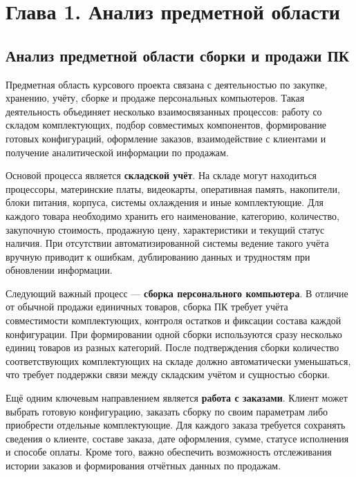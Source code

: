 \section*{Глава 1. Анализ предметной области}

\subsection{Анализ предметной области сборки и продажи ПК}

Предметная область курсового проекта связана с деятельностью по закупке, хранению, учёту, сборке и продаже персональных компьютеров. Такая деятельность объединяет несколько взаимосвязанных процессов: работу со складом комплектующих, подбор совместимых компонентов, формирование готовых конфигураций, оформление заказов, взаимодействие с клиентами и получение аналитической информации по продажам.

Основой процесса является \textbf{складской учёт}. На складе могут находиться процессоры, материнские платы, видеокарты, оперативная память, накопители, блоки питания, корпуса, системы охлаждения и иные комплектующие. Для каждого товара необходимо хранить его наименование, категорию, количество, закупочную стоимость, продажную цену, характеристики и текущий статус наличия. При отсутствии автоматизированной системы ведение такого учёта вручную приводит к ошибкам, дублированию данных и трудностям при обновлении информации.

Следующий важный процесс --- \textbf{сборка персонального компьютера}. В отличие от обычной продажи единичных товаров, сборка ПК требует учёта совместимости комплектующих, контроля остатков и фиксации состава каждой конфигурации. При формировании одной сборки используются сразу несколько единиц товаров из разных категорий. После подтверждения сборки количество соответствующих комплектующих на складе должно автоматически уменьшаться, что требует поддержки связи между складским учётом и сущностью сборки.

Ещё одним ключевым направлением является \textbf{работа с заказами}. Клиент может выбрать готовую конфигурацию, заказать сборку по своим параметрам либо приобрести отдельные комплектующие. Для каждого заказа требуется сохранять сведения о клиенте, составе заказа, дате оформления, сумме, статусе исполнения и способе оплаты. Кроме того, важно обеспечить возможность отслеживания истории заказов и формирования отчётных данных по продажам.

